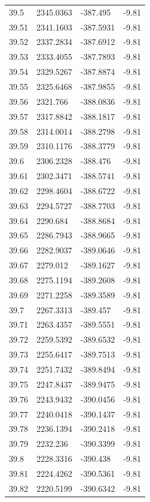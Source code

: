 \begin{table}[H]
\begin{tabular}{llll}
39.5 & 2345.0363 & -387.495 & -9.81 \\
39.51 & 2341.1603 & -387.5931 & -9.81 \\
39.52 & 2337.2834 & -387.6912 & -9.81 \\
39.53 & 2333.4055 & -387.7893 & -9.81 \\
39.54 & 2329.5267 & -387.8874 & -9.81 \\
39.55 & 2325.6468 & -387.9855 & -9.81 \\
39.56 & 2321.766 & -388.0836 & -9.81 \\
39.57 & 2317.8842 & -388.1817 & -9.81 \\
39.58 & 2314.0014 & -388.2798 & -9.81 \\
39.59 & 2310.1176 & -388.3779 & -9.81 \\
39.6 & 2306.2328 & -388.476 & -9.81 \\
39.61 & 2302.3471 & -388.5741 & -9.81 \\
39.62 & 2298.4604 & -388.6722 & -9.81 \\
39.63 & 2294.5727 & -388.7703 & -9.81 \\
39.64 & 2290.684 & -388.8684 & -9.81 \\
39.65 & 2286.7943 & -388.9665 & -9.81 \\
39.66 & 2282.9037 & -389.0646 & -9.81 \\
39.67 & 2279.012 & -389.1627 & -9.81 \\
39.68 & 2275.1194 & -389.2608 & -9.81 \\
39.69 & 2271.2258 & -389.3589 & -9.81 \\
39.7 & 2267.3313 & -389.457 & -9.81 \\
39.71 & 2263.4357 & -389.5551 & -9.81 \\
39.72 & 2259.5392 & -389.6532 & -9.81 \\
39.73 & 2255.6417 & -389.7513 & -9.81 \\
39.74 & 2251.7432 & -389.8494 & -9.81 \\
39.75 & 2247.8437 & -389.9475 & -9.81 \\
39.76 & 2243.9432 & -390.0456 & -9.81 \\
39.77 & 2240.0418 & -390.1437 & -9.81 \\
39.78 & 2236.1394 & -390.2418 & -9.81 \\
39.79 & 2232.236 & -390.3399 & -9.81 \\
39.8 & 2228.3316 & -390.438 & -9.81 \\
39.81 & 2224.4262 & -390.5361 & -9.81 \\
39.82 & 2220.5199 & -390.6342 & -9.81 \\

\end{tabular}
\end{table}
